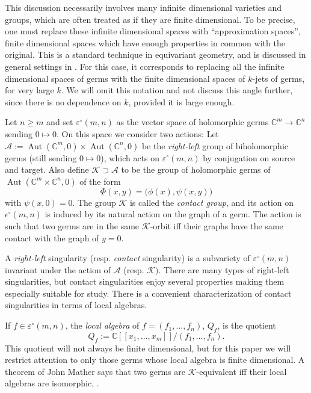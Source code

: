 \documentclass[11pt]{article}
\theoremstyle{plain}
\theoremstyle{definition}
\theoremstyle{definition}
\DeclareMathOperator{\Aut}{Aut}
\newcommand{\C}{\mathbb{C}}
\begin{document}
This discussion necessarily involves many infinite dimensional varieties and groups, which are often treated as if they are finite dimensional. To be precise, one must replace these infinite dimensional spaces with ``approximation spaces'', finite dimensional spaces which have enough properties in common with the original. This is a standard technique in equivariant geometry, and is discussed in general settings in \cite{AF}. For this case, it corresponds to replacing all the infinite dimensional spaces of germs with the finite dimensional spaces of $k$-jets of germs, for very large $k$. We will omit this notation and not discuss this angle further, since there is no dependence on $k$, provided it is large enough. 


Let $n\geq m$ and set $\varepsilon^\circ(m,n)$ as the vector space of holomorphic germs $\C^m\to \C^n$ sending $0\mapsto 0$. On this space we consider two actions: Let $\mathcal A :=\Aut(\C^m,0)\times \Aut(\C^n,0)$ be the \textit{right-left} group of biholomorphic germs (still sending $0\mapsto 0$), which acts on $\varepsilon^\circ(m,n)$ by conjugation on source and target. Also define $\mathcal K\supset \mathcal A$ to be the group of holomorphic germs of $\Aut(\C^m\times \C^n,0)$ of the form 
\[
\Phi(x,y) = \big(\phi(x),\psi(x,y)\big)
\]
with $\psi(x,0)=0$. The group $\mathcal K$ is called the \textit{contact group}, and its action on $\epsilon^\circ(m,n)$ is induced by its natural action on the graph of a germ. The action is such that two germs are in the same $\mathcal K$-orbit iff their graphs have the same contact with the graph of $y=0$.

A \textit{right-left} singularity (resp. \textit{contact} singularity) is a subvariety of $\varepsilon^\circ(m,n)$ invariant under the action of $\mathcal A$ (resp. $\mathcal K)$. There are many types of right-left singularities, but contact singularities enjoy several properties making them especially suitable for study. There is a convenient characterization of contact singularities in terms of local algebras. 

If $f\in \varepsilon^\circ(m,n)$, the \textit{local algebra} of $f=(f_1,\dots,f_n)$, $Q_f$, is the quotient 
\[
Q_f:=\C[[x_1,\dots,x_m]]/(f_1,\dots,f_n).
\]
This quotient will not always be finite dimensional, but for this paper we will restrict attention to only those germs whose local algebra is finite dimensional. 
A theorem of John Mather says that two germs are $\mathcal K$-equivalent iff their local algebras are isomorphic, \cite{mather}. 
\end{document}
